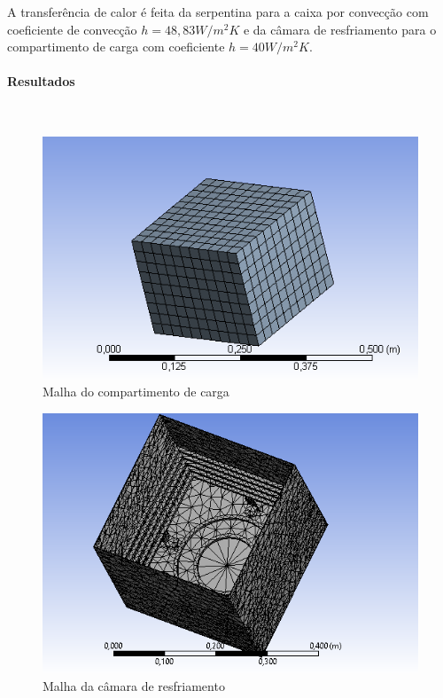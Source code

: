 A transferência de calor é feita da serpentina para a caixa por convecção com coeficiente de convecção $h = 48,83 W/m^2K$ e da câmara de resfriamento para o compartimento de carga com coeficiente $h = 40 W/m^2K$.

\paragraph*{Resultados}\

\begin{figure}[H]
	\centering
	\includegraphics[]{figuras/meshcompartimento.png}
	\caption{Malha do compartimento de carga}
\end{figure}

\begin{figure}[H]
	\centering
	\includegraphics[]{figuras/meshcamara.png}
	\caption{Malha da câmara de resfriamento}
\end{figure}

